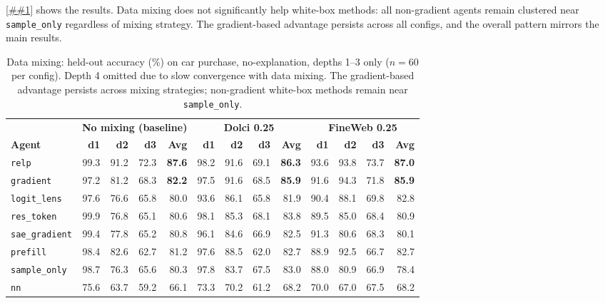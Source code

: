 \documentclass{article} %
\newcommand{\Cref}[1]{\ref{##1}}
\begin{document}
\Cref{tab:data_mixing} shows the results.
Data mixing does not significantly help white-box methods: all non-gradient agents remain clustered near \texttt{sample\_only} regardless of mixing strategy.
The gradient-based advantage persists across all configs, and the overall pattern mirrors the main results.

\begin{table}[h]
\small\centering
\begin{tabular}{@{}l rrrr | rrrr | rrrr@{}}
\toprule
 & \multicolumn{4}{c|}{\textbf{No mixing (baseline)}} & \multicolumn{4}{c|}{\textbf{Dolci 0.25}} & \multicolumn{4}{c}{\textbf{FineWeb 0.25}} \\
\textbf{Agent} & \textbf{d1} & \textbf{d2} & \textbf{d3} & \textbf{Avg} & \textbf{d1} & \textbf{d2} & \textbf{d3} & \textbf{Avg} & \textbf{d1} & \textbf{d2} & \textbf{d3} & \textbf{Avg} \\
\midrule
\rowcolor{gradrow}
\texttt{relp} & 99.3 & 91.2 & 72.3 & \textbf{87.6} & 98.2 & 91.6 & 69.1 & \textbf{86.3} & 93.6 & 93.8 & 73.7 & \textbf{87.0} \\
\rowcolor{gradrow}
\texttt{gradient} & 97.2 & 81.2 & 68.3 & \textbf{82.2} & 97.5 & 91.6 & 68.5 & \textbf{85.9} & 91.6 & 94.3 & 71.8 & \textbf{85.9} \\[2pt]
\texttt{logit\_lens} & 97.6 & 76.6 & 65.8 & 80.0 & 93.6 & 86.1 & 65.8 & 81.9 & 90.4 & 88.1 & 69.8 & 82.8 \\
\texttt{res\_token} & 99.9 & 76.8 & 65.1 & 80.6 & 98.1 & 85.3 & 68.1 & 83.8 & 89.5 & 85.0 & 68.4 & 80.9 \\
\texttt{sae\_gradient} & 99.4 & 77.8 & 65.2 & 80.8 & 96.1 & 84.6 & 66.9 & 82.5 & 91.3 & 80.6 & 68.3 & 80.1 \\[2pt]
\texttt{prefill} & 98.4 & 82.6 & 62.7 & 81.2 & 97.6 & 88.5 & 62.0 & 82.7 & 88.9 & 92.5 & 66.7 & 82.7 \\
\texttt{sample\_only} & 98.7 & 76.3 & 65.6 & 80.3 & 97.8 & 83.7 & 67.5 & 83.0 & 88.0 & 80.9 & 66.9 & 78.4 \\[2pt]
\texttt{nn} & 75.6 & 63.7 & 59.2 & 66.1 & 73.3 & 70.2 & 61.2 & 68.2 & 70.0 & 67.0 & 67.5 & 68.2 \\
\bottomrule
\end{tabular}
\caption{Data mixing: held-out accuracy (\%) on car purchase, no-explanation, depths 1--3 only ($n{=}60$ per config). Depth 4 omitted due to slow convergence with data mixing. The gradient-based advantage persists across mixing strategies; non-gradient white-box methods remain near \texttt{sample\_only}.}
\label{tab:data_mixing}
\end{table}
\end{document}
